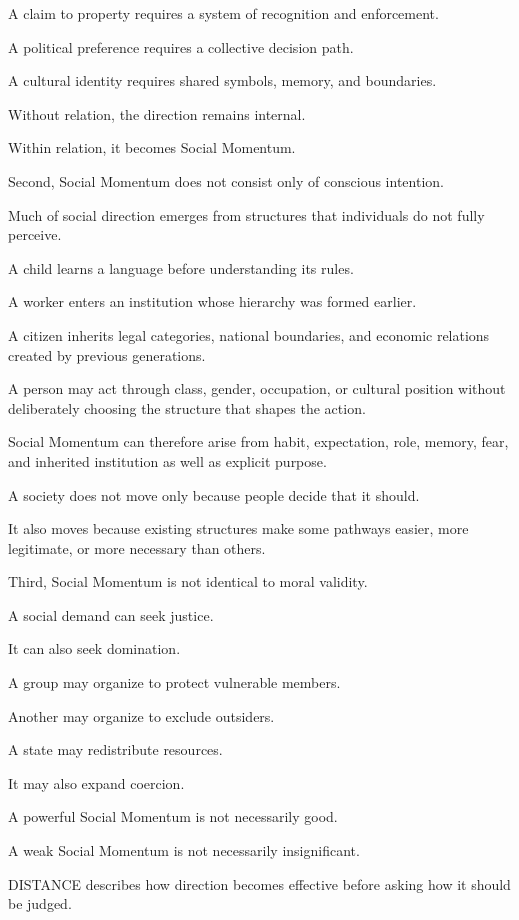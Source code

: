 A claim to property requires a system of recognition and enforcement.

A political preference requires a collective decision path.

A cultural identity requires shared symbols, memory, and boundaries.

Without relation, the direction remains internal.

Within relation, it becomes Social Momentum.

Second, Social Momentum does not consist only of conscious intention.

Much of social direction emerges from structures that individuals do not fully perceive.

A child learns a language before understanding its rules.

A worker enters an institution whose hierarchy was formed earlier.

A citizen inherits legal categories, national boundaries, and economic relations created by previous generations.

A person may act through class, gender, occupation, or cultural position without deliberately choosing the structure that shapes the action.

Social Momentum can therefore arise from habit, expectation, role, memory, fear, and inherited institution as well as explicit purpose.

A society does not move only because people decide that it should.

It also moves because existing structures make some pathways easier, more legitimate, or more necessary than others.

Third, Social Momentum is not identical to moral validity.

A social demand can seek justice.

It can also seek domination.

A group may organize to protect vulnerable members.

Another may organize to exclude outsiders.

A state may redistribute resources.

It may also expand coercion.

A powerful Social Momentum is not necessarily good.

A weak Social Momentum is not necessarily insignificant.

DISTANCE describes how direction becomes effective before asking how it should be judged.

